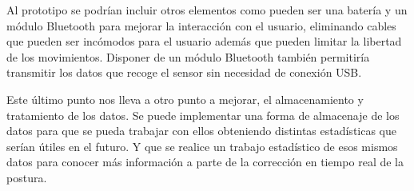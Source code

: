 Al prototipo se podrían incluir otros elementos como pueden ser una batería y un módulo Bluetooth para mejorar la interacción con el usuario, eliminando cables que pueden ser incómodos para el usuario además que pueden limitar la libertad de los movimientos. Disponer de un módulo Bluetooth también permitiría transmitir los datos que recoge el sensor sin necesidad de conexión USB. 

Este último punto nos lleva a otro punto a mejorar, el almacenamiento y tratamiento de los datos. Se puede implementar una forma de almacenaje de los datos para que se pueda trabajar con ellos obteniendo distintas estadísticas que serían útiles en el futuro. Y que se realice un trabajo estadístico de esos mismos datos para conocer más información a parte de la corrección en tiempo real de la postura.
